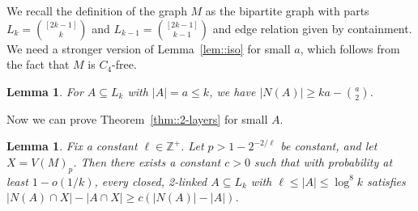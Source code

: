 \documentclass[12pt]{article}
\newtheorem{lemma}[theorem]{Lemma}
\begin{document}
We recall the definition of the graph $M$ as the bipartite graph with parts $L_k = \binom{[2k-1]}{k}$ and $L_{k-1} = \binom{[2k-1]}{k-1}$ and edge relation given by containment. We need a stronger version of Lemma~\ref{lem::iso} for small $a$, which follows from the fact that $M$ is $C_4$-free.

\begin{lemma}\label{lem::iso-small-a}
For $A \subseteq L_k$ with $|A| = a \leq k$, we have $|N(A)| \geq ka - \binom{a}{2}$.
\end{lemma}

Now we can prove Theorem~\ref{thm::2-layers} for small $A$.

\begin{lemma}\label{lem::small a}
Fix a constant $\ell \in \mathbb{Z}^+$. Let $p > 1-2^{-2/\ell}$ be constant, and let $X = V(M)_p$. Then there exists a constant $c>0$ such that with probability at least $1-o(1/k)$, every closed, 2-linked $A \subseteq L_k$ with $\ell \leq |A| \leq \log^8 k$ satisfies $|N(A) \cap X| - |A \cap X| \geq c(|N(A)|-|A|)$. 
\end{lemma}
\end{document}
